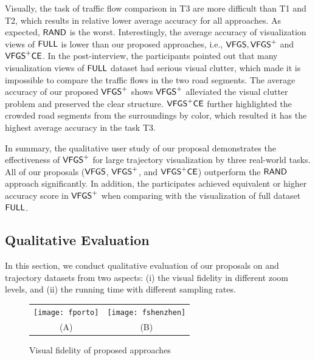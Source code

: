 

Visually, the task of traffic flow comparison in T3 are more difficult than T1 and T2, which results in relative lower average accuracy for all approaches.  As expected, $\mathsf{RAND}$ is the worst.
Interestingly, the average accuracy of visualization views of $\mathsf{FULL}$ is lower than our proposed approaches, i.e., $\mathsf{VFGS},\mathsf{VFGS}^{+}$ and $\mathsf{VFGS}^{+}\mathsf{CE}$.
In the post-interview, the participants pointed out that many visualization views of $\mathsf{FULL}$ dataset had serious visual clutter,
which made it is impossible to compare the traffic flows in the two road segments.
The average accuracy of our proposed $\mathsf{VFGS}^{+}$ shows $\mathsf{VFGS}^{+}$ alleviated the visual clutter problem and preserved the clear structure.
$\mathsf{VFGS}^{+}\mathsf{CE}$ further highlighted the crowded road segments from the surroundings by color, which resulted it has the highest average accuracy in the task T3.

In summary, the qualitative user study of our proposal demonstrates the effectiveness of $\mathsf{VFGS}^{+}$ for large trajectory visualization by three real-world tasks.
All of our proposals ($\mathsf{VFGS}$, $\mathsf{VFGS}^{+}$, and $\mathsf{VFGS}^{+}\mathsf{CE}$) outperform the $\mathsf{RAND}$ approach significantly.
In addition, the participates achieved equivalent or higher accuracy score in $\mathsf{VFGS}^{+}$ when comparing with the visualization of full dataset $\mathsf{FULL}$.


\subsection{Qualitative Evaluation}\label{sec:quality}
In this section, we conduct qualitative evaluation of our proposals on \pt{} and \sz{} trajectory datasets from two aspects: (i) the visual fidelity in different zoom levels,
and (ii) the running time with different sampling rates.

\begin{figure}
 \centering
 \small
 \begin{tabular}{cc}
   \texttt{[image: fporto]}
   &
   \texttt{[image: fshenzhen]}
   \\
   (A) \pt{}
   &
   (B) \sz{}
 \end{tabular}
 \vspace{-2mm}
 \caption{Visual fidelity of proposed approaches}
 \label{fig:fidelity}
 \vspace{-4mm}
\end{figure}

